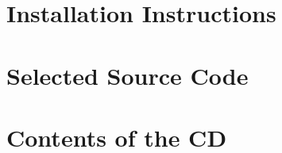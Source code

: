 \appendix
\appendixpage
\addappheadtotoc

\section{Installation Instructions}
\subsection{}

\section{Selected Source Code}

\section{Contents of the CD}